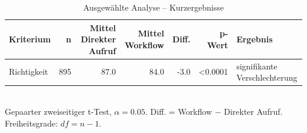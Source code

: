 \begin{table}[htbp]
\centering
\caption{Ausgewählte Analyse -- Kurzergebnisse}
\begin{tabular}{lrrrrrl}
\toprule
Kriterium & n & Mittel Direkter Aufruf & Mittel Workflow & Diff. & p-Wert & Ergebnis \\
\midrule
Richtigkeit & 895 & 87.0 & 84.0 & -3.0 & <0.0001 & signifikante Verschlechterung \\
\bottomrule
\end{tabular}
\\[2mm]
\footnotesize Gepaarter zweiseitiger t-Test, $\alpha=0.05$. Diff. = Workflow $-$ Direkter Aufruf. Freiheitsgrade: $df=n-1$.
\end{table}
